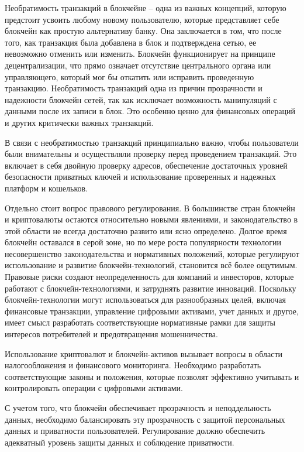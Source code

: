Необратимость транзакций в блокчейне -- одна из важных концепций, которую предстоит усвоить любому новому пользователю, которые представляет себе блокчейн как простую альтернативу банку. Она заключается в том, что после того, как транзакция была добавлена в блок и подтверждена сетью, ее невозможно отменить или изменить. Блокчейн функционирует на принципе децентрализации, что прямо означает отсутствие центрального органа или управляющего, который мог бы откатить или исправить проведенную транзакцию. Необратимость транзакций одна из причин прозрачности и надежности блокчейн сетей, так как исключает возможность манипуляций с данными после их записи в блок. Это особенно ценно для финансовых операций и других критически важных транзакций.

В связи с необратимостью транзакций принципиально важно, чтобы пользователи были внимательны и осуществляли проверку перед проведением транзакций. Это включает в себя двойную проверку адресов, обеспечение достаточных уровней безопасности приватных ключей и использование проверенных и надежных платформ и кошельков.

Отдельно стоит вопрос правового регулирования. В большинстве стран блокчейн и криптовалюты остаются относительно новыми явлениями, и законодательство в этой области не всегда достаточно развито или ясно определено. Долгое время блокчейн оставался в серой зоне, но по мере роста популярности технологии несовершенство законодательства и нормативных положений, которые регулируют использование и развитие блокчейн-технологий, становится всё более ощутимым. Правовые риски создают неопределенность для компаний и инвесторов, которые работают с блокчейн-технологиями, и затруднять развитие инноваций. Поскольку блокчейн-технологии могут использоваться для разнообразных целей, включая финансовые транзакции, управление цифровыми активами, учет данных и другое, имеет смысл разработать соответствующие нормативные рамки для защиты интересов потребителей и предотвращения мошенничества.

Использование криптовалют и блокчейн-активов вызывает вопросы в области налогообложения и финансового мониторинга. Необходимо разработать соответствующие законы и положения, которые позволят эффективно учитывать и контролировать операции с цифровыми активами.

С учетом того, что блокчейн обеспечивает прозрачность и неподдельность данных, необходимо балансировать эту прозрачность с защитой персональных данных и приватности пользователей. Регулирование должно обеспечить адекватный уровень защиты данных и соблюдение приватности.


